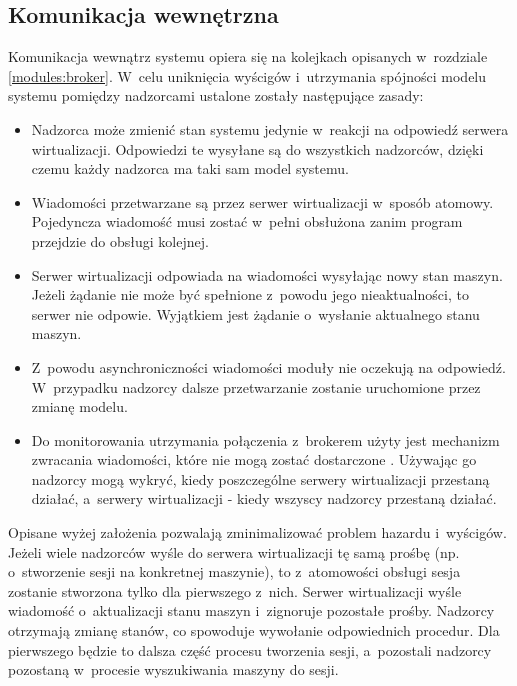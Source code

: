 \documentclass[../opis-rozwiazania.tex]{subfiles}
\begin{document}
\label{communication}

\subsection{Komunikacja wewnętrzna}
\label{communication:broker}

Komunikacja wewnątrz systemu opiera się na kolejkach opisanych w~rozdziale \ref{modules:broker}. W~celu uniknięcia wyścigów i~utrzymania spójności modelu systemu pomiędzy nadzorcami ustalone zostały następujące zasady:
\begin{itemize}
  \item Nadzorca może zmienić stan systemu jedynie w~reakcji na odpowiedź serwera wirtualizacji. Odpowiedzi te wysyłane są do wszystkich nadzorców, dzięki czemu każdy nadzorca ma taki sam model systemu.
  \item Wiadomości przetwarzane są przez serwer wirtualizacji w~sposób atomowy. Pojedyncza wiadomość musi zostać w~pełni obsłużona zanim program przejdzie do obsługi kolejnej.
  \item Serwer wirtualizacji odpowiada na wiadomości wysyłając nowy stan maszyn. Jeżeli żądanie nie może być spełnione z~powodu jego nieaktualności, to serwer nie odpowie. Wyjątkiem jest żądanie o~wysłanie aktualnego stanu maszyn.
  \item Z~powodu asynchroniczności wiadomości moduły nie oczekują na odpowiedź. W~przypadku nadzorcy dalsze przetwarzanie zostanie uruchomione przez zmianę modelu.
  \item Do monitorowania utrzymania połączenia z~brokerem użyty jest mechanizm zwracania wiadomości, które nie mogą zostać dostarczone \parencite{rabbit-unroutable}. Używając go nadzorcy mogą wykryć, kiedy poszczególne serwery wirtualizacji przestaną działać, a~serwery wirtualizacji - kiedy wszyscy nadzorcy przestaną działać.
\end{itemize}

Opisane wyżej założenia pozwalają zminimalizować problem hazardu i~wyścigów. Jeżeli wiele nadzorców wyśle do serwera wirtualizacji tę samą prośbę (np. o~stworzenie sesji na konkretnej maszynie), to z~atomowości obsługi sesja zostanie stworzona tylko dla pierwszego z~nich. Serwer wirtualizacji wyśle wiadomość o~aktualizacji stanu maszyn i~zignoruje pozostałe prośby. Nadzorcy otrzymają zmianę stanów, co spowoduje wywołanie odpowiednich procedur. Dla pierwszego będzie to dalsza część procesu tworzenia sesji, a~pozostali nadzorcy pozostaną w~procesie wyszukiwania maszyny do sesji.
\end{document}
